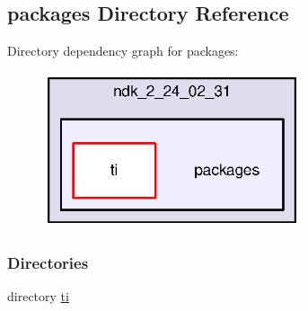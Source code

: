 \subsection{packages Directory Reference}
\label{dir_16c225f92d85c2647011474909c4aadf}
Directory dependency graph for packages\+:
\nopagebreak
\begin{figure}[H]
\begin{center}
\leavevmode
\includegraphics[width=215pt]{dir_16c225f92d85c2647011474909c4aadf_dep}
\end{center}
\end{figure}
\subsubsection*{Directories}
\begin{DoxyCompactItemize}
\item 
directory \hyperlink{dir_3f051719e97ef21bd60ea5e21f7dc6b4}{ti}
\end{DoxyCompactItemize}
